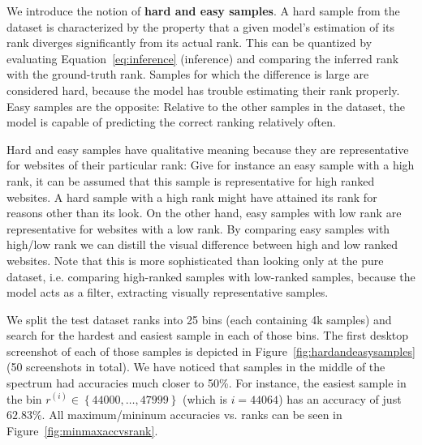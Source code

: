 \begin{figure}
    \label{fig:activationmaps}
\end{figure}

We introduce the notion of \textbf{hard and easy samples}. A hard sample from the dataset is characterized by the property that a given model's estimation of its rank diverges significantly from its actual rank. This can be quantized by evaluating Equation~\ref{eq:inference} (inference) and comparing the inferred rank with the ground-truth rank. Samples for which the difference is large are considered hard, because the model has trouble estimating their rank properly. Easy samples are the opposite: Relative to the other samples in the dataset, the model is capable of predicting the correct ranking relatively often.

Hard and easy samples have qualitative meaning because they are representative for websites of their particular rank: Give for instance an easy sample with a high rank, it can be assumed that this sample is representative for high ranked websites. A hard sample with a high rank might have attained its rank for reasons other than its look. On the other hand, easy samples with low rank are representative for websites with a low rank. By comparing easy samples with high/low rank we can distill the visual difference between high and low ranked websites. Note that this is more sophisticated than looking only at the pure dataset, i.e. comparing high-ranked samples with low-ranked samples, because the model acts as a filter, extracting visually representative samples.

We split the test dataset ranks into 25 bins (each containing 4k samples) and search for the hardest and easiest sample in each of those bins. The first desktop screenshot of each of those samples is depicted in Figure~\ref{fig:hardandeasysamples} (50 screenshots in total). We have noticed that samples in the middle of the spectrum had accuracies much closer to 50\%. For instance, the easiest sample in the bin $r^{(i)}\in{\left\{44000, \dots, 47999\right\}}$ (which is $i=44064$) has an accuracy of just $62.83\%$. All maximum/mininum accuracies vs. ranks can be seen in Figure~\ref{fig:minmaxaccvsrank}.


